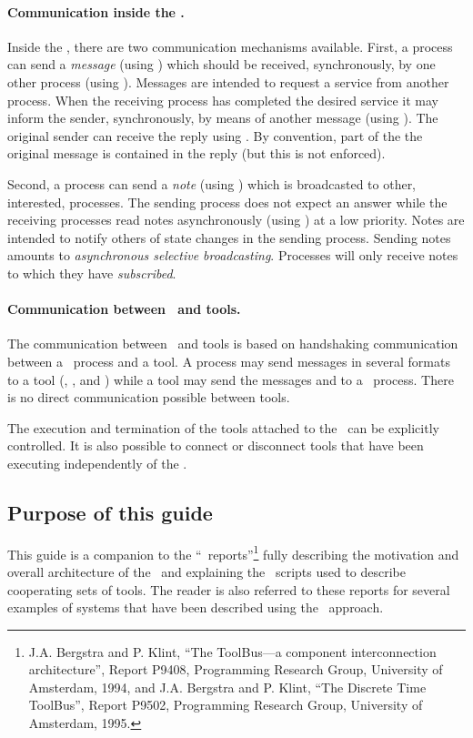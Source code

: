 \paragraph{Communication inside the \TB.}
Inside the \TB, there are two communication mechanisms available.
First, a process can send a {\em message} (using ) which
should be received, synchronously, by one other process (using
). Messages are intended to request a service from another
process. When the receiving process has completed the desired service
it may inform the sender, synchronously, by means of another message (using
). The original sender can receive the reply using
.  By convention, part of the the original message is contained
in the reply (but this is not enforced).

Second, a process can send a {\em note} (using ) which is
broadcasted to other, interested, processes. The sending process does
not expect an answer while the receiving processes read notes
asynchronously (using ) at a low priority. Notes are
intended to notify others of state changes in the sending process.
Sending notes amounts to {\em asynchronous selective broadcasting}.
Processes will only receive notes to which they have {\em subscribed}.

\paragraph{Communication between \TB\ and tools.}
The communication between \TB\ and tools is based on handshaking
communication between a \TB\ process and a tool.  A process may send
messages in several formats to a tool (, ,
and ) while a tool may send the messages 
and  to a \TB\ process.  There is no direct communication
possible between tools.

The execution and termination of the tools attached to the \TB\ can be
explicitly controlled. It is also possible to connect or disconnect
tools that have been executing independently of the \TB.

\subsection{Purpose of this guide}
This guide is a companion to the ``\TB\ reports''\footnote{ J.A. Bergstra and
P. Klint, ``The ToolBus---a component interconnection architecture'',
Report P9408, Programming Research Group, University of Amsterdam,
1994, and J.A. Bergstra and P. Klint, ``The Discrete Time ToolBus'',
Report P9502, Programming Research Group, University of Amsterdam, 1995.}
fully describing the motivation and overall architecture of the
\TB\ and explaining the \T\ scripts used to describe cooperating sets
of tools. The reader is also referred to these reports for several examples
of systems that have been described using the \TB\ approach.

